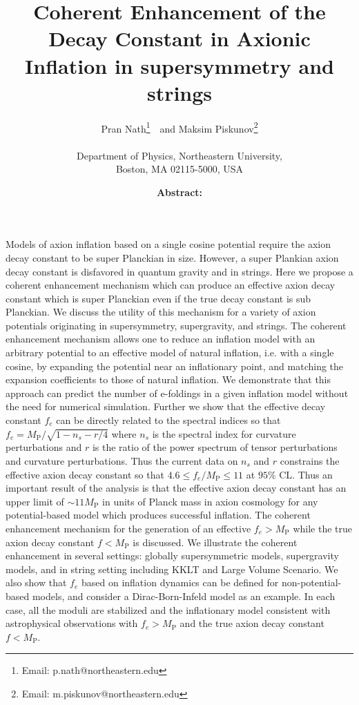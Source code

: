 \documentclass[12pt]{article}
\author{
  Pran Nath\footnote{Email: p.nath@northeastern.edu}~\ and
  Maksim Piskunov\footnote{Email: m.piskunov@northeastern.edu}\\~\\
  Department of Physics, Northeastern University,\\
  Boston, MA 02115-5000, USA
}
\title{
  Coherent Enhancement of the Decay Constant
  in Axionic Inflation in supersymmetry and strings
}
\begin{document}
\maketitle
\date

\textbf{Abstract:}
Models of axion inflation based on a single cosine potential require the axion decay constant to be super Planckian in size.
However, a super Plankian axion decay constant is disfavored in quantum gravity and in strings.
Here we propose a coherent enhancement mechanism which can produce an effective axion decay constant which is super Planckian even if the true decay constant is sub Planckian.
We discuss the utility of this mechanism for a variety of axion potentials originating in supersymmetry, supergravity, and strings.
The coherent enhancement mechanism allows one to reduce an inflation model with an arbitrary potential to an effective model of natural inflation, i.e. with a single cosine, by expanding the potential near an inflationary point, and matching the expansion coefficients to those of natural inflation.
We demonstrate that this approach can predict the number of e-foldings in a given inflation model without the need for numerical simulation.
Further we show that the effective decay constant $f_e$ can be directly related to the spectral indices so that $f_e = M_\text{P} / \sqrt{1 - n_s - r / 4}$ where $n_s$ is the spectral index for curvature perturbations and $r$ is the ratio of the power spectrum of tensor perturbations and curvature perturbations.
Thus the current data on $n_s$ and $r$ constrains the effective axion decay constant so that $4.6 \leq f_e / M_\text{P} \leq 11$ at $95\%$ CL.
Thus an important result of the analysis is that the effective axion decay constant has an upper limit of $\sim 11 M_\text{P}$ in units of Planck mass in axion cosmology for any potential-based model which produces successful inflation.
The coherent enhancement mechanism for the generation of an effective $f_e > M_\text{P}$ while the true axion decay constant $f < M_\text{P}$ is discussed.
We illustrate the coherent enhancement in several settings: globally supersymmetric models, supergravity models, and in string setting including KKLT and Large Volume Scenario.
We also show that $f_e$ based on inflation dynamics can be defined for non-potential-based models, and consider a Dirac-Born-Infeld model as an example.
In each case, all the moduli are stabilized and the inflationary model consistent with astrophysical observations with $f_e > M_\text{P}$ and the true axion decay constant $f < M_\text{P}$.
\newpage
\end{document}

